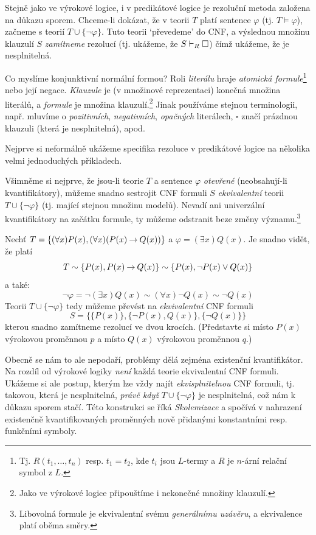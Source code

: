 Stejně jako ve výrokové logice, i v predikátové logice je rezoluční metoda založena na důkazu sporem. Chceme-li dokázat, že v teorii $T$ platí sentence $\varphi$ (tj. $T\models\varphi$), začneme s teorií $T\cup\{\neg \varphi\}$. Tuto teorii `převedeme' do CNF, a výslednou množinu klauzulí $S$ \emph{zamítneme} rezolucí (tj. ukážeme, že $S\vdash_R\square$) čímž ukážeme, že je nesplnitelná.

Co myslíme konjunktivní normální formou? Roli \emph{literálu} hraje \emph{atomická formule}\footnote{Tj. $R(t_1,\dots,t_n)$ resp. $t_1=t_2$, kde $t_i$ jsou $L$-termy a $R$ je $n$-ární relační symbol z $L$.} nebo její negace. \emph{Klauzule} je (v množinové reprezentaci) konečná množina literálů, a \emph{formule} je množina klauzulí.\footnote{Jako ve výrokové logice připouštíme i nekonečné množiny klauzulí.} Jinak používáme stejnou terminologii, např. mluvíme o \emph{pozitivních}, \emph{negativních}, \emph{opačných} literálech, $\square$ značí prázdnou klauzuli (která je nesplnitelná), apod.

Nejprve si neformálně ukážeme specifika rezoluce v predikátové logice na několika velmi jednoduchých příkladech.

Všimněme si nejprve, že jsou-li teorie $T$ a sentence $\varphi$ \emph{otevřené} (neobsahují-li kvantifikátory), můžeme snadno sestrojit CNF formuli $S$ \emph{ekvivalentní} teorii $T\cup\{\neg \varphi\}$ (tj. mající stejnou množinu modelů). Nevadí ani univerzální kvantifikátory na začátku formule, ty můžeme odstranit beze změny významu.\footnote{Libovolná formule je ekvivalentní svému \emph{generálnímu uzávěru}, a ekvivalence platí oběma směry.}

\begin{example}
    Nechť $T=\{(\forall x)P(x),(\forall x)(P(x)\mathbin{\rightarrow} Q(x))\}$ a $\varphi=(\exists x)Q(x)$. Je snadno vidět, že platí
    $$
    T\sim \{P(x),P(x)\mathbin{\rightarrow} Q(x)\}\sim\{P(x),\neg P(x)\lor Q(x)\}
    $$ 
    a také:
    $$\neg\varphi=\neg(\exists x)Q(x)\sim(\forall x)\neg Q(x)\sim\neg Q(x)$$ 
    Teorii $T\cup\{\neg \varphi\}$ tedy můžeme převést na \emph{ekvivalentní} CNF formuli
    $$
    S = \{\{P(x)\},\{\neg P(x),Q(x)\},\{\neg Q(x)\}\}
    $$
    kterou snadno zamítneme rezolucí ve dvou krocích. (Představte si místo $P(x)$ výrokovou proměnnou $p$ a místo $Q(x)$ výrokovou proměnnou $q$.)
\end{example}

Obecně se nám to ale nepodaří, problémy dělá zejména existenční kvantifikátor. Na rozdíl od výrokové logiky \emph{není} každá teorie ekvivalentní CNF formuli. Ukážeme si ale postup, kterým lze vždy najít \emph{ekvisplnitelnou} CNF formuli, tj. takovou, která je nesplnitelná, \emph{právě když} $T\cup\{\neg \varphi\}$ je nesplnitelná, což nám k důkazu sporem stačí. Této konstrukci se říká \emph{Skolemizace} a spočívá v nahrazení existenčně kvantifikovaných proměnných nově přidanými konstantními resp. funkčními symboly. 

